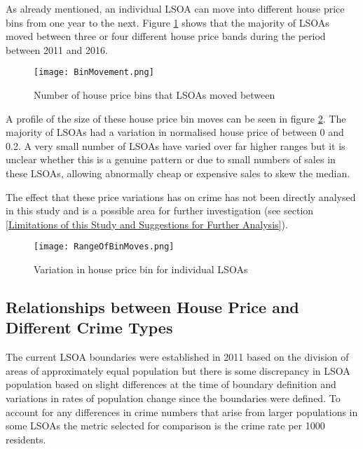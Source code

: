 \documentclass{article}
\begin{document}
As already mentioned, an individual LSOA can move into different house price bins from one year to the next. Figure \ref{fig:BinMovement} shows that the majority of LSOAs moved between three or four different house price bands during the period between 2011 and 2016.
\newline

\begin{figure}[H]
\begin{center}
  \texttt{[image: BinMovement.png]}
  \caption{Number of house price bins that LSOAs moved between}
  \label{fig:BinMovement}
\end{center}
\end{figure}
\bigskip

A profile of the size of these house price bin moves can be seen in figure \ref{fig:RangeOfBinMoves}. The majority of LSOAs had a variation in normalised house price of between 0 and 0.2. A very small number of LSOAs have varied over far higher ranges but it is unclear whether this is a genuine pattern or due to small numbers of sales in these LSOAs, allowing abnormally cheap or expensive sales to skew the median.

The effect that these price variations has on crime has not been directly analysed in this study and is a possible area for further investigation (see section \ref{Limitations of this Study and Suggestions for Further Analysis}).

\begin{figure}[H]
\begin{center}
  \texttt{[image: RangeOfBinMoves.png]}
  \caption{Variation in house price bin for individual LSOAs}
  \label{fig:RangeOfBinMoves}
\end{center}
\end{figure}

\subsection{Relationships between House Price and Different Crime Types} \label{Relationships between House Price and Different Crime Types}
The current LSOA boundaries were established in 2011 based on the division of areas of approximately equal population but there is some discrepancy in LSOA population based on slight differences at the time of boundary definition and variations in rates of population change since the boundaries were defined. To account for any differences in crime numbers that arise from larger populations in some LSOAs the metric selected for comparison is the crime rate per 1000 residents.
\end{document}
